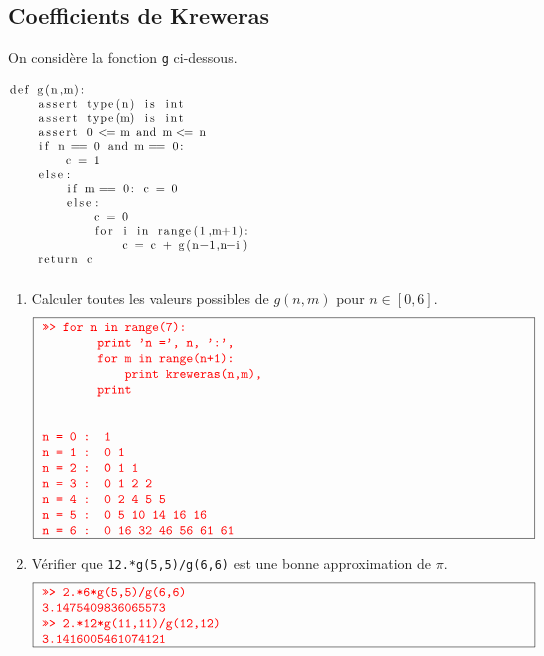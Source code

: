 \subsection*{Coefficients de Kreweras}
On consid\`ere la fonction {\tt g} ci-dessous.
$$\begin{minipage}[t]{15cm}
\begin{lstlisting}
def g(n,m):
    assert type(n) is int
    assert type(m) is int
    assert 0 <= m and m <= n
    if n == 0 and m == 0:
        c = 1
    else:
        if m == 0: c = 0
        else:
            c = 0
            for i in range(1,m+1):
                c = c + g(n-1,n-i)
    return c
\end{lstlisting}
\end{minipage}$$
\begin{enumerate}
\item Calculer toutes les valeurs possibles
	de $g(n,m)$ pour $n \in [0,6]$.
	$$\framebox[13.5cm]{\begin{minipage}{13cm}\color{red}\tt
	>>> for n in range(7):\\
        \mbox{}\ \ \ \ \ \ \ \ print 'n =', n, '\char`:',\\
        \mbox{}\ \ \ \ \ \ \ \ for m in range(n+1):\\
        \mbox{}\ \ \ \ \ \ \ \ \ \ \ \ print kreweras(n,m),\\
        \mbox{}\ \ \ \ \ \ \ \ print\\
	\mbox{}\\
	\mbox{}\\	
	n = 0  : 1\\
	n = 1  : 0 1\\
	n = 2  : 0 1 1\\
	n = 3  : 0 1 2 2\\
	n = 4  : 0 2 4 5 5\\
	n = 5  : 0 5 10 14 16 16\\
	n = 6  : 0 16 32 46 56 61 61
	\end{minipage}}$$

\item Vérifier que {\tt 12.*g(5,5)/g(6,6)} est une bonne approximation de
	$\pi$.
	$$\framebox[13.5cm]{\begin{minipage}{13cm}\color{red}\tt
	>>> 2.*6*g(5,5)/g(6,6)\\
        3.1475409836065573\\
	>>> 2.*12*g(11,11)/g(12,12)\\
	3.1416005461074121
	\end{minipage}}$$

\end{enumerate}

